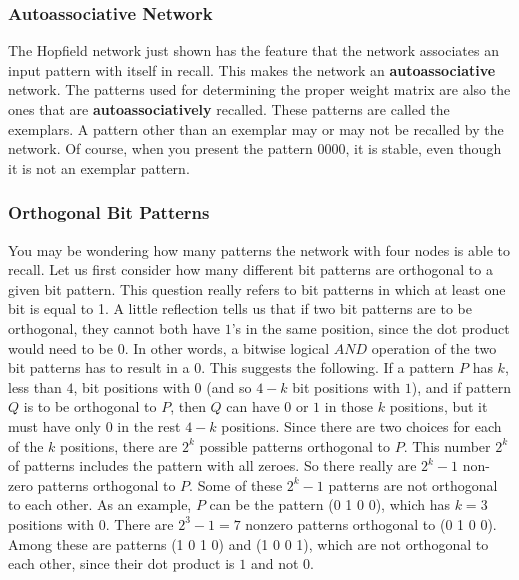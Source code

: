 \subsubsection{Autoassociative Network}
The Hopfield network just shown has the feature that the network associates an
input pattern with itself in recall. This makes the network an \textbf{autoassociative}
network. The patterns used for determining the proper weight matrix are also
the ones that are \textbf{autoassociatively} recalled. These patterns are called the
exemplars. A pattern other than an exemplar may or may not be recalled by the
network. Of course, when you present the pattern $0 0 0 0$, it is stable, even
though it is not an exemplar pattern.
\subsubsection{Orthogonal Bit Patterns}
You may be wondering how many patterns the network with four nodes is able
to recall. Let us first consider how many different bit patterns are orthogonal to
a given bit pattern. This question really refers to bit patterns in which at least
one bit is equal to 1. A little reflection tells us that if two bit patterns are to be
orthogonal, they cannot both have $1$'s in the same position, since the dot
product would need to be $0$. In other words, a bitwise logical $AND$ operation
of the two bit patterns has to result in a $0$. This suggests the following. If a
pattern $P$ has $k$, less than $4$, bit positions with $0$ (and so $4-k$ bit positions with
$1$), and if pattern $Q$ is to be orthogonal to $P$, then $Q$ can have $0$ or $1$ in those $k$ positions, but it must have only $0$ in the rest $4-k$ positions. Since there are two
choices for each of the $k$ positions, there are $2^k$ possible patterns orthogonal to
$P$. This number $2^k$ of patterns includes the pattern with all zeroes. So there
really are $2^k-1$ non-zero patterns orthogonal to $P$. Some of these $2^k-1$ patterns are not orthogonal to each other. As an example, $P$ can be the pattern (0 1 0 0),
which has $k=3$ positions with $0$. There are $2^3-1=7$ nonzero patterns
orthogonal to (0 1 0 0). Among these are patterns (1 0 1 0) and (1 0 0 1), which are
not orthogonal to each other, since their dot product is $1$ and not $0$.


